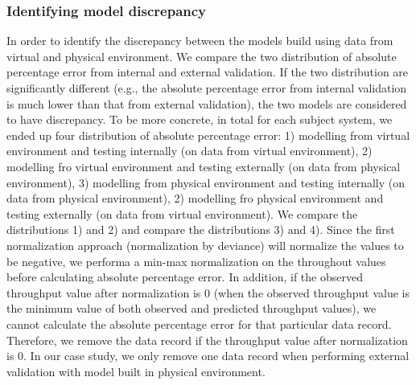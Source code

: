 \subsubsection{Identifying model discrepancy}
In order to identify the discrepancy between the models build using data from virtual and physical environment. We compare the two distribution of absolute percentage error from internal and external validation. If the two distribution are significantly different (e.g., the absolute percentage error from internal validation is much lower than that from external validation), the two models are considered to have discrepancy. To be more concrete, in total for each subject system, we ended up four distribution of absolute percentage error: 1) modelling from virtual environment and testing internally (on data from virtual environment), 2) modelling fro virtual environment and testing externally (on data from physical environment), 3) modelling from physical environment and testing internally (on data from physical environment), 2) modelling fro physical environment and testing externally (on data from virtual environment). We compare the distributions 1) and 2) and compare the distributions 3) and 4). Since the first normalization approach (normalization by deviance) will normalize the values to be negative, we performa a min-max normalization on the throughout values before calculating absolute percentage error. In addition, if the observed throughput value after normalization is 0 (when the observed throughput value is the minimum value of both observed and predicted throughput values), we cannot calculate the absolute percentage error for that particular data record. Therefore, we remove the data record if the throughput value after normalization is 0. In our case study, we only remove one data record when performing external validation with model built in physical environment. 







	
